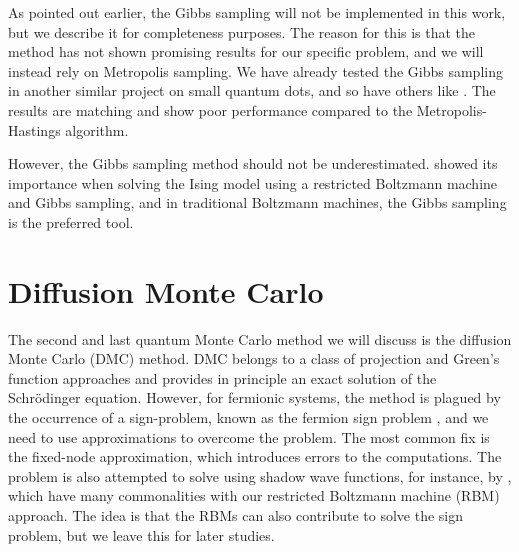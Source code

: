 As pointed out earlier, the Gibbs sampling will not be implemented in this work, but we describe it for completeness purposes. The reason for this is that the method has not shown promising results for our specific problem, and we will instead rely on Metropolis sampling. We have already tested the Gibbs sampling in another similar project on small quantum dots, and so have others like \citet{flugsrud_vilde_moe_solving_nodate}. The results are matching and show poor performance compared to the Metropolis-Hastings algorithm.

However, the Gibbs sampling method should not be underestimated. \citet{carleo_solving_2017} showed its importance when solving the Ising model using a restricted Boltzmann machine and Gibbs sampling, and in traditional Boltzmann machines, the Gibbs sampling is the preferred tool.

\section{Diffusion Monte Carlo} \label{sec:dmc}
The second and last quantum Monte Carlo method we will discuss is the diffusion Monte Carlo (DMC) method. DMC belongs to a class of projection and Green's function approaches and provides in principle an exact solution of the Schrödinger equation. However, for fermionic systems, the method is plagued by the occurrence of a sign-problem, known as the fermion sign problem \supercite{troyer_computational_2005}, and we need to use approximations to overcome the problem. The most common fix is the fixed-node approximation, which introduces errors to the computations. The problem is also attempted to solve using shadow wave functions, for instance, by \citet{calcavecchia_sign_2014}, which have many commonalities with our restricted Boltzmann machine (RBM) approach. The idea is that the RBMs can also contribute to solve the sign problem, but we leave this for later studies. 

